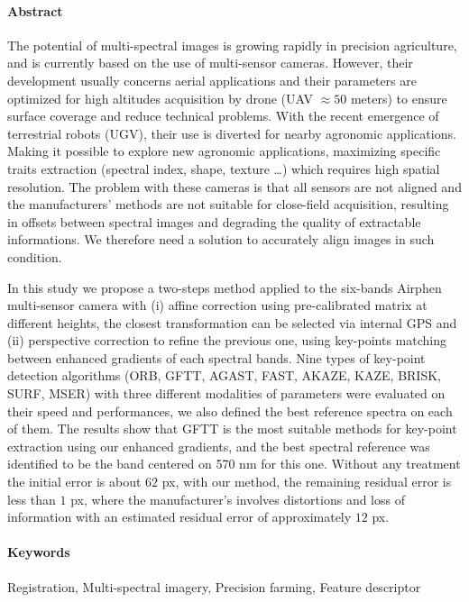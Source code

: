 \documentclass[../thesis.tex]{subfiles}
\begin{document}
	\paragraph{Abstract}{
		The potential of multi-spectral images is growing rapidly in precision agriculture,
		and is currently based on the use of multi-sensor cameras.
		However, their development usually concerns aerial applications and their parameters are optimized
		for high altitudes acquisition by drone (UAV $\approx 50$ meters) to ensure surface coverage and reduce technical problems.
		With the recent emergence of terrestrial robots (UGV), their use is diverted for nearby agronomic applications.
		Making it possible to explore new agronomic applications, maximizing specific traits extraction (spectral index, shape, texture \dots)
		which requires high spatial resolution.
		The problem with these cameras is that all sensors are not aligned and the manufacturers' methods are not suitable for close-field acquisition,
		resulting in offsets between spectral images and degrading the quality of extractable informations.
		We therefore need a solution to accurately align images in such condition.
		
		\par In this study we propose a two-steps method applied to the six-bands Airphen multi-sensor camera with
		(i) affine correction using pre-calibrated matrix at different heights, the closest transformation can be selected via internal GPS
		and (ii) perspective correction to refine the previous one, using key-points matching between enhanced gradients of each spectral bands.
		Nine types of key-point detection algorithms (ORB, GFTT, AGAST, FAST, AKAZE, KAZE, BRISK, SURF, MSER) with three different modalities of parameters
		were evaluated on their speed and performances, we also defined the best reference spectra on each of them.
		The results show that GFTT is the most suitable methods for key-point extraction using our enhanced gradients,
		and the best spectral reference was identified to be the band centered on 570 nm for this one.
		Without any treatment the initial error is about $62$ px, with our method, the remaining residual error is less than $1$ px,
		where the manufacturer's involves distortions and loss of information with an estimated residual error of approximately $12$ px.
	}

	\paragraph{Keywords} Registration, Multi-spectral imagery, Precision farming, Feature descriptor
    \vfill
	
\end{document}
